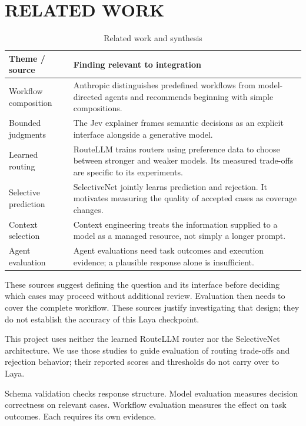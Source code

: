 \documentclass[10pt,a4paper]{article}
\begin{document}
\section{RELATED WORK}
\begin{table}[H]
\centering\small
\renewcommand{\arraystretch}{1.15}
\begin{tabularx}{\linewidth}{@{}YY@{}}
\toprule
\textbf{Theme / source} & \textbf{Finding relevant to integration} \\
\midrule
Workflow composition \cite{r7} & Anthropic distinguishes predefined workflows from model-directed agents and recommends beginning with simple compositions. \\
Bounded judgments \cite{r1} & The Jev explainer frames semantic decisions as an explicit interface alongside a generative model. \\
Learned routing \cite{r8} & RouteLLM trains routers using preference data to choose between stronger and weaker models. Its measured trade-offs are specific to its experiments. \\
Selective prediction \cite{r9} & SelectiveNet jointly learns prediction and rejection. It motivates measuring the quality of accepted cases as coverage changes. \\
Context selection \cite{r10} & Context engineering treats the information supplied to a model as a managed resource, not simply a longer prompt. \\
Agent evaluation \cite{r11} & Agent evaluations need task outcomes and execution evidence; a plausible response alone is insufficient. \\
\bottomrule
\end{tabularx}
\caption{Related work and synthesis}
\end{table}
These sources suggest defining the question and its interface before deciding which cases may proceed without additional review. Evaluation then needs to cover the complete workflow. These sources justify investigating that design; they do not establish the accuracy of this Laya checkpoint.

This project uses neither the learned RouteLLM router nor the SelectiveNet architecture. We use those studies to guide evaluation of routing trade-offs and rejection behavior; their reported scores and thresholds do not carry over to Laya.

Schema validation checks response structure. Model evaluation measures decision correctness on relevant cases. Workflow evaluation measures the effect on task outcomes. Each requires its own evidence.
\end{document}
